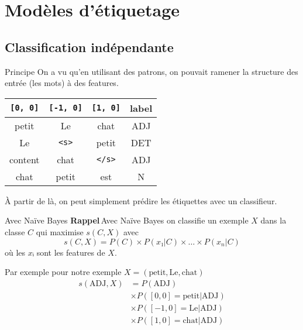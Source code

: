 \documentclass[hyperref={unicode}, xcolor={svgnames}, french]{beamer}
\begin{document}
\section{Modèles d'étiquetage}
\subsection{Classification indépendante}
\begin{frame}[fragile]{Principe}
	On a vu qu'en utilisant des patrons, on pouvait ramener la structure des entrée (les mots) à des features.

	\begin{table}
		\begin{tabu} to .9\textwidth {cccc}
			\texttt{[0, 0]}	& \texttt{[-1, 0]}	& \texttt{[1, 0]}	& label\\
			\midrule
			petit	& Le	& chat	& ADJ\\
			Le	& \texttt{<s>}	& petit	& DET\\
			content	& chat	& \texttt{</s>}	& ADJ\\
			chat	& petit	& est	& N
		\end{tabu}
	\end{table}

	À partir de là, on peut simplement prédire les étiquettes avec un classifieur.
\end{frame}

\begin{frame}{Avec Naïve Bayes}
	\textbf{Rappel} Avec Naïve Bayes on classifie un exemple $X$ dans la classe $C$ qui maximise $s(C,X)$ avec
	\begin{equation}
		s(C,X) = P(C) × P(x₁|C) × … × P(x_n|C)
	\end{equation}
	où les $xᵢ$ sont les features de $X$.

	Par exemple pour notre exemple $X = (\text{petit}, \text{Le}, \text{chat})$
	\begin{equation}
		\begin{split}
			s(\text{ADJ}, X)
				&= P(\text{ADJ})\\
				&× P([0,0]=\text{petit}|\text{ADJ})\\
				&× P([-1,0]=\text{Le}|\text{ADJ})\\
				&× P([1,0]=\text{chat}|\text{ADJ})
		\end{split}
	\end{equation}
\end{frame}
\end{document}
